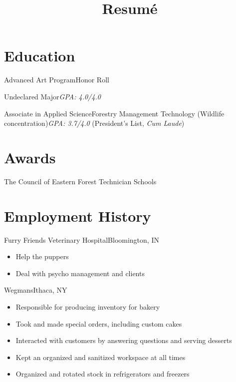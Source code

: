 \documentclass[11pt,a4paper,sans]{moderncv}        %
\title{Resumé}
\begin{document}
\makecvtitle

\section{Education}
{Advanced Art Program}{Honor Roll} {} {}

{Undeclared Major}{}{\textit{GPA: 4.0/4.0}}{}

{Associate in Applied Science}{Forestry Management Technology (Wildlife concentration)}{\textit{GPA: 3.7/4.0} (President's List, \textit{Cum Laude})}{}

\section{Awards}
{The Council of Eastern Forest Technician Schools}

\section{Employment History}
{}
{Furry Friends Veterinary Hospital}{Bloomington, IN}{
\begin{itemize}
\item
Help the puppers
\item
Deal with psycho management and clients
\end{itemize}
}%

{}
{Wegmans}{Ithaca, NY}{
\begin{itemize}
\item
Responsible for producing inventory for bakery
\item
Took and made special orders, including custom cakes
\item
Interacted with customers by answering questions and serving desserts
\item
Kept an organized and sanitized workspace at all times
\item
Organized and rotated stock in refrigerators and freezers
\end{itemize}
}%
\end{document}
